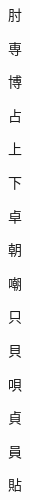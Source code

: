 \begin{spacing}{2.5}
{\Huge \begin{CJK}{UTF8}{min} 肘\end{CJK}}\hspace{0.1cm}
{\Huge \begin{CJK}{UTF8}{min} 専\end{CJK}}\hspace{0.1cm}
{\Huge \begin{CJK}{UTF8}{min} 博\end{CJK}}\hspace{0.1cm}
{\Huge \begin{CJK}{UTF8}{min} 占\end{CJK}}\hspace{0.1cm}
{\Huge \begin{CJK}{UTF8}{min} 上\end{CJK}}\hspace{0.1cm}
{\Huge \begin{CJK}{UTF8}{min} 下\end{CJK}}\hspace{0.1cm}
{\Huge \begin{CJK}{UTF8}{min} 卓\end{CJK}}\hspace{0.1cm}
{\Huge \begin{CJK}{UTF8}{min} 朝\end{CJK}}\hspace{0.1cm}
{\Huge \begin{CJK}{UTF8}{min} 嘲\end{CJK}}\hspace{0.1cm}
{\Huge \begin{CJK}{UTF8}{min} 只\end{CJK}}\hspace{0.1cm}
{\Huge \begin{CJK}{UTF8}{min} 貝\end{CJK}}\hspace{0.1cm}
{\Huge \begin{CJK}{UTF8}{min} 唄\end{CJK}}\hspace{0.1cm}
{\Huge \begin{CJK}{UTF8}{min} 貞\end{CJK}}\hspace{0.1cm}
{\Huge \begin{CJK}{UTF8}{min} 員\end{CJK}}\hspace{0.1cm}
{\Huge \begin{CJK}{UTF8}{min} 貼\end{CJK}}\hspace{0.1cm}

\end{spacing}
